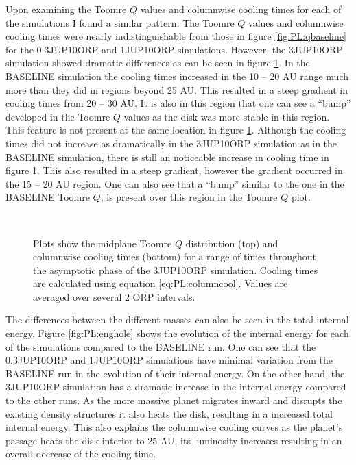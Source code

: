 Upon examining the Toomre $Q$ values and columnwise cooling times for each of the simulations I found a similar pattern. The Toomre $Q$ values and columnwise cooling times were nearly indistinguishable from those in figure \ref{fig:PL:qbaseline} for the 0.3JUP10ORP and 1JUP10ORP simulations. However, the 3JUP10ORP simulation showed dramatic differences as can be seen in figure \ref{fig:PL:qHOLE3JUP}. In the BASELINE simulation the cooling times increased in the 10 -- 20 AU range much more than they did in regions beyond 25 AU. This resulted in a steep gradient in cooling times from 20 -- 30 AU. It is also in this region that one can see a ``bump'' developed in the Toomre $Q$ values as the disk was more stable in this region. This feature is not present at the same location in figure \ref{fig:PL:qHOLE3JUP}. Although the cooling times did not increase as dramatically in the 3JUP10ORP simulation as in the BASELINE simulation, there is still an noticeable increase in cooling time in figure \ref{fig:PL:qHOLE3JUP}. This also resulted in a steep gradient, however the gradient occurred in the 15 -- 20 AU region. One can also see that a  ``bump'' similar to the one in the BASELINE Toomre $Q$, is present over this region in the Toomre $Q$ plot.

\begin{figure}[p]
\centering
{}\\
\caption[NEED TAGLINE]{Plots show the midplane Toomre $Q$ distribution (top) and columnwise cooling times (bottom) for a range of times throughout the asymptotic phase of the 3JUP10ORP simulation. Cooling times are calculated using equation \eqref{eq:PL:columncool}. Values are averaged over several $2$ ORP intervals.}
\label{fig:PL:qHOLE3JUP}
\end{figure}

The differences between the different masses can also be seen in the total internal energy. Figure \ref{fig:PL:enghole} shows the evolution of the internal energy for each of the simulations compared to the BASELINE run. One can see that the 0.3JUP10ORP and 1JUP10ORP simulations have minimal variation from the BASELINE run in the evolution of their internal energy. On the other hand, the 3JUP10ORP simulation has a dramatic increase in the internal energy compared to the other runs. As the more massive planet migrates inward and disrupts the existing density structures it also heats the disk, resulting in a increased total internal energy. This also explains the columnwise cooling curves as the planet's passage heats the disk interior to 25 AU, its luminosity increases resulting in an overall decrease of the cooling time.

